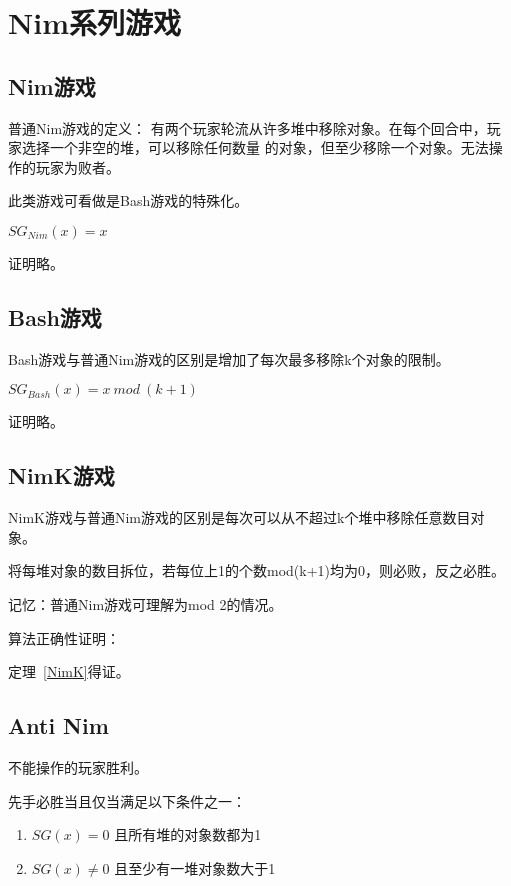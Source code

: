 \section{Nim系列游戏}

\subsection{Nim游戏}

普通Nim游戏的定义：
有两个玩家轮流从许多堆中移除对象。在每个回合中，玩家选择一个非空的堆，可以移除任何数量
的对象，但至少移除一个对象。无法操作的玩家为败者。

此类游戏可看做是Bash游戏的特殊化。

\begin{Theorem}
	$SG_{Nim}(x)=x$
\end{Theorem}

证明略。

\subsection{Bash游戏}

Bash游戏与普通Nim游戏的区别是增加了每次最多移除k个对象的限制。

\begin{Theorem}
	$SG_{Bash}(x)=x~mod~(k+1)$
\end{Theorem}

证明略。

\subsection{NimK游戏}

NimK游戏与普通Nim游戏的区别是每次可以从不超过k个堆中移除任意数目对象。

\begin{Theorem}\label{NimK}
	将每堆对象的数目拆位，若每位上1的个数mod(k+1)均为0，则必败，反之必胜。
\end{Theorem}

记忆：普通Nim游戏可理解为mod 2的情况。

算法正确性证明：



定理~\ref{NimK}得证。

\subsection{Anti Nim}

不能操作的玩家胜利。

\begin{Theorem}\label{AntiNim}
	先手必胜当且仅当满足以下条件之一：
	\begin{enumerate}
		\item $SG(x)=0$ 且所有堆的对象数都为1
		\item $SG(x)\not=0$ 且至少有一堆对象数大于1
	\end{enumerate}

\end{Theorem}


